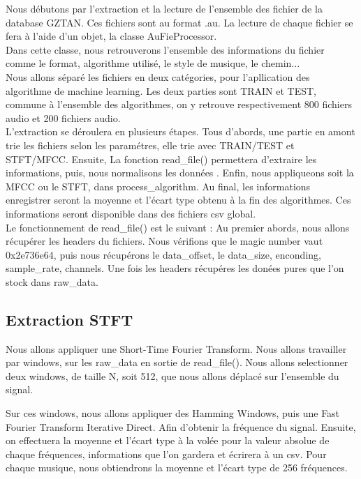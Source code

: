 \documentclass[10pt]{article}
\begin{document}
\begin{minipage}[t]{0.6\linewidth}
Nous débutons par l'extraction et la lecture de l'ensemble des fichier de la database GZTAN. Ces fichiers sont au format .au. La lecture de chaque fichier se fera à l'aide d'un objet, la classe AuFieProcessor. \\

Dans cette classe, nous retrouverons l'ensemble des informations du fichier comme le format, algorithme utilisé, le style de musique, le chemin...\\
Nous allons séparé les fichiers en deux catégories, pour l'apllication des algorithme de machine learning. Les deux parties sont TRAIN et TEST, commune à l'ensemble des algorithmes, on y retrouve respectivement 800 fichiers audio et 200 fichiers audio. \\

L'extraction se déroulera en plusieurs étapes. Tous d'abords, une partie en amont trie les fichiers selon les paramétres, elle trie avec TRAIN/TEST et STFT/MFCC. Ensuite, La fonction read\_file() permettera d'extraire les informations, puis, nous normalisons les données . Enfin, nous appliqueons soit la MFCC ou le STFT, dans process\_algorithm. Au final, les informations enregistrer seront la moyenne et l'écart type  obtenu à la fin des algorithmes. Ces informations seront disponible dans des fichiers csv global. \\ 

Le fonctionnement de read\_file() est le suivant : Au premier abords, nous allons récupérer les headers du fichiers. Nous vérifions que le magic number vaut 0x2e736e64, puis nous récupérons le data\_offset, le data\_size, enconding, sample\_rate, channels. Une fois les headers récupéres les donées pures que l'on stock dans raw\_data.
\end{minipage}%


\subsection{Extraction STFT}


Nous allons appliquer une Short-Time Fourier Transform. Nous allons travailler par windows, sur les raw\_data en sortie de read\_file(). Nous allons selectionner deux windows, de taille N, soit 512, que nous allons déplacé sur l'ensemble du signal. 

Sur ces windows, nous allons appliquer des Hamming Windows, puis une Fast Fourier Transform Iterative Direct. Afin d'obtenir la fréquence du signal. Ensuite, on effectuera la moyenne et l'écart type à la volée pour la valeur absolue de chaque fréquences, informations que l'on gardera et écrirera à un csv. Pour chaque musique, nous obtiendrons la moyenne et l'écart type de 256 fréquences.
\end{document}
